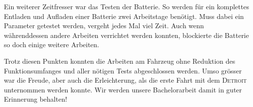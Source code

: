 Ein weiterer Zeitfresser war das Testen der Batterie. So werden für ein komplettes Entladen und Aufladen einer Batterie zwei Arbeitstage benötigt. Muss dabei ein Parameter getestet werden, vergeht jedes Mal viel Zeit. Auch wenn währenddessen andere Arbeiten verrichtet werden konnten, blockierte die Batterie so doch einige weitere Arbeiten.

Trotz diesen Punkten konnten die Arbeiten am Fahrzeug ohne Reduktion des Funktionsumfanges und aller nötigen Tests abgeschlossen werden. Umso grösser war die Freude, aber auch die Erleichterung, als die erste Fahrt mit dem \textsc{Detroit} unternommen werden konnte. Wir werden unsere Bachelorarbeit damit in guter Erinnerung behalten!